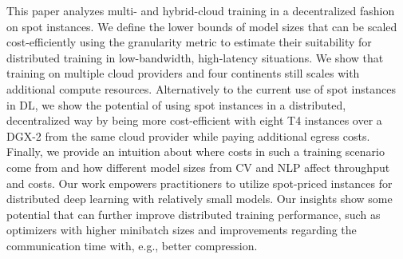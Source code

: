 This paper analyzes multi- and hybrid-cloud training in a decentralized fashion on spot instances. 
We define the lower bounds of model sizes that can be scaled cost-efficiently using the granularity metric to estimate their suitability for distributed training in low-bandwidth, high-latency situations.
We show that training on multiple cloud providers and four continents still scales with additional compute resources.
Alternatively to the current use of spot instances in DL, we show the potential of using spot instances in a distributed, decentralized way by being more cost-efficient with eight T4 instances over a DGX-2 from the same cloud provider while paying additional egress costs.
Finally, we provide an intuition about where costs in such a training scenario come from and how different model sizes from CV and NLP affect throughput and costs.
Our work empowers practitioners to utilize spot-priced instances for distributed deep learning with relatively small models. 
Our insights show some potential that can further improve distributed training performance, such as optimizers with higher minibatch sizes and improvements regarding the communication time with, e.g., better compression. 